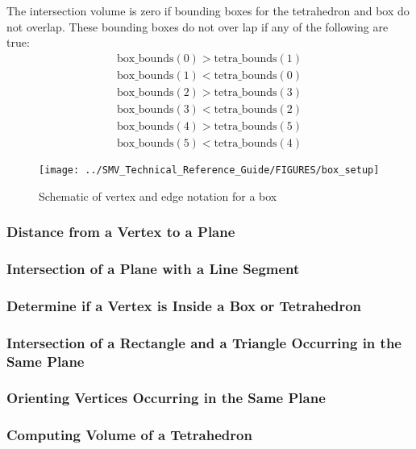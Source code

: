 \documentclass[12pt]{article}
\begin{document}
\noindent The intersection volume is zero if bounding boxes for the tetrahedron and box do not overlap.
These bounding boxes do not over lap if any of the following are true:
\begin{eqnarray*}
\mbox{box\_bounds}(0)>\mbox{tetra\_bounds}(1) \\
\mbox{box\_bounds}(1)<\mbox{tetra\_bounds}(0) \\
\mbox{box\_bounds}(2)>\mbox{tetra\_bounds}(3) \\
\mbox{box\_bounds}(3)<\mbox{tetra\_bounds}(2) \\
\mbox{box\_bounds}(4)>\mbox{tetra\_bounds}(5) \\
\mbox{box\_bounds}(5)<\mbox{tetra\_bounds}(4)
\end{eqnarray*}

\begin{figure}[\figoptions]
\begin{center}
\texttt{[image: ../SMV\_Technical\_Reference\_Guide/FIGURES/box\_setup]}
\end{center}
\caption{Schematic of vertex and edge notation for a box}
\label{figure:box_setup}
\end{figure}

\subsubsection{Distance from a Vertex to a Plane}
\subsubsection{Intersection of a Plane with a Line Segment}
\subsubsection{Determine if a Vertex is Inside a Box or Tetrahedron}
\subsubsection{Intersection of a Rectangle and a Triangle Occurring in the Same Plane}
\subsubsection{Orienting Vertices Occurring in the Same Plane}
\subsubsection{Computing Volume of a Tetrahedron}
\end{document}
